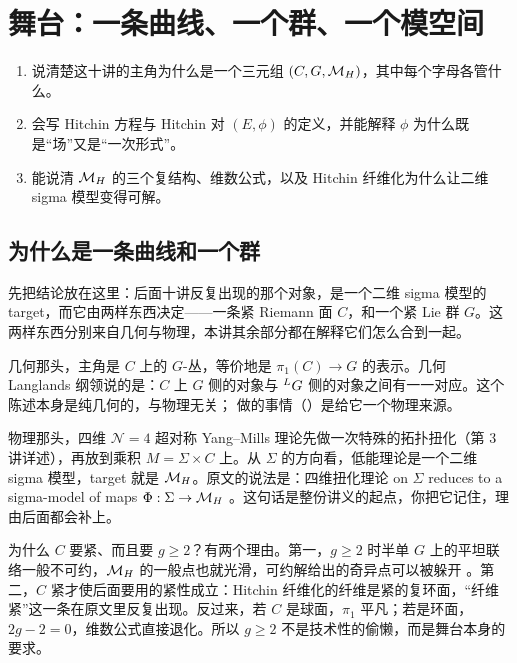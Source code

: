 
\section{舞台：一条曲线、一个群、一个模空间}
\label{sec:stage}

\begin{goals}
\begin{enumerate}
\item 说清楚这十讲的主角为什么是一个三元组 $(C,G,\mathcal{M}_{H})$，其中每个字母各管什么。
\item 会写 Hitchin 方程与 Hitchin 对 $(E,\phi)$ 的定义，并能解释 $\phi$ 为什么既是“场”又是“一次形式”。
\item 能说清 $\mathcal{M}_{H}$ 的三个复结构、维数公式，以及 Hitchin 纤维化为什么让二维 sigma 模型变得可解。
\end{enumerate}
\end{goals}

\subsection{为什么是一条曲线和一个群}

先把结论放在这里：后面十讲反复出现的那个对象，是一个二维 sigma 模型的 target，而它由两样东西决定——一条紧 Riemann 面 $C$，和一个紧 Lie 群 $G$。这两样东西分别来自几何与物理，本讲其余部分都在解释它们怎么合到一起。

几何那头，主角是 $C$ 上的 $G$-丛，等价地是 $\pi_1(C)\to G$ 的表示。几何 Langlands 纲领说的是：$C$ 上 $G$ 侧的对象与 ${}^{L}G$ 侧的对象之间有一一对应。这个陈述本身是纯几何的，与物理无关；\kw{} 做的事情（\cite{kw06}）是给它一个物理来源。

物理那头，四维 $\mathcal N=4$ 超对称 Yang--Mills 理论先做一次特殊的拓扑扭化（第 3 讲详述），再放到乘积 $M=\Sigma\times C$ 上。从 $\Sigma$ 的方向看，低能理论是一个二维 sigma 模型，target 就是 $\mathcal{M}_{H}$。原文的说法是：四维扭化理论 on $\Sigma$ reduces to a sigma-model of maps $\Phi:\Sigma\to \mathcal{M}_{H}$ 。这句话是整份讲义的起点，你把它记住，理由后面都会补上。

为什么 $C$ 要紧、而且要 $g\ge 2$？有两个理由。第一，$g\ge2$ 时半单 $G$ 上的平坦联络一般不可约，$\mathcal{M}_{H}$ 的一般点也就光滑，可约解给出的奇异点可以被躲开 。第二，$C$ 紧才使后面要用的紧性成立：Hitchin 纤维化的纤维是紧的复环面，“纤维紧”这一条在原文里反复出现。反过来，若 $C$ 是球面，$\pi_1$ 平凡；若是环面，$2g-2=0$，维数公式直接退化。所以 $g\ge2$ 不是技术性的偷懒，而是舞台本身的要求。

